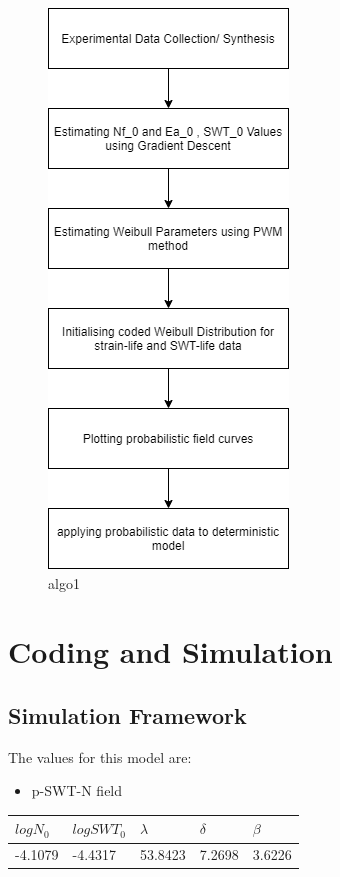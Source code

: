 \documentclass[11pt]{article}
\providecommand{\tightlist}{%
      \setlength{\itemsep}{0pt}\setlength{\parskip}{0pt}}
\begin{document}
\begin{figure}
\centering
\includegraphics[scale=0.69]{images/algo1.png}
\caption{algo1}
\end{figure}

\hypertarget{coding-and-simulation}{%
\section{Coding and Simulation}\label{coding-and-simulation}}

\hypertarget{simulation-framework}{%
\subsection{Simulation Framework}\label{simulation-framework}}

The values for this model are:

\begin{itemize}
\tightlist
\item
  p-SWT-N field
\end{itemize}

\begin{longtable}[]{@{}lllll@{}}
\toprule
\(logN_0\) & \(logSWT_0\) & \(\lambda\) & \(\delta\) &
\(\beta\)\tabularnewline
\midrule
\endhead
-4.1079 & -4.4317 & 53.8423 & 7.2698 & 3.6226\tabularnewline
\bottomrule
\end{longtable}
\end{document}
